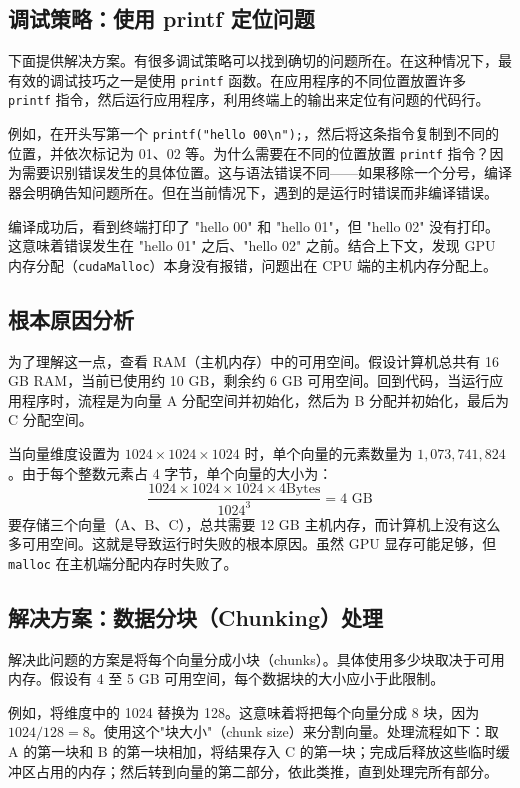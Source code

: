 \subsection{调试策略：使用 printf 定位问题}

下面提供解决方案。有很多调试策略可以找到确切的问题所在。在这种情况下，最有效的调试技巧之一是使用 \texttt{printf} 函数。在应用程序的不同位置放置许多 \texttt{printf} 指令，然后运行应用程序，利用终端上的输出来定位有问题的代码行。

例如，在开头写第一个 \texttt{printf("hello 00\textbackslash n");}，然后将这条指令复制到不同的位置，并依次标记为 01、02 等。为什么需要在不同的位置放置 \texttt{printf} 指令？因为需要识别错误发生的具体位置。这与语法错误不同——如果移除一个分号，编译器会明确告知问题所在。但在当前情况下，遇到的是运行时错误而非编译错误。

编译成功后，看到终端打印了 "hello 00" 和 "hello 01"，但 "hello 02" 没有打印。这意味着错误发生在 "hello 01" 之后、"hello 02" 之前。结合上下文，发现 GPU 内存分配（\texttt{cudaMalloc}）本身没有报错，问题出在 CPU 端的主机内存分配上。

\subsection{根本原因分析}

为了理解这一点，查看 RAM（主机内存）中的可用空间。假设计算机总共有 16 GB RAM，当前已使用约 10 GB，剩余约 6 GB 可用空间。回到代码，当运行应用程序时，流程是为向量 A 分配空间并初始化，然后为 B 分配并初始化，最后为 C 分配空间。

当向量维度设置为 $1024 \times 1024 \times 1024$ 时，单个向量的元素数量为 $1,073,741,824$。由于每个整数元素占 4 字节，单个向量的大小为：
\[\frac{1024 \times 1024 \times 1024 \times 4 \text{Bytes}}{1024^3} = 4 \text{ GB}\]要存储三个向量（A、B、C），总共需要 12 GB 主机内存，而计算机上没有这么多可用空间。这就是导致运行时失败的根本原因。虽然 GPU 显存可能足够，但 \texttt{malloc} 在主机端分配内存时失败了。

\subsection{解决方案：数据分块（Chunking）处理}

解决此问题的方案是将每个向量分成小块（chunks）。具体使用多少块取决于可用内存。假设有 4 至 5 GB 可用空间，每个数据块的大小应小于此限制。

例如，将维度中的 1024 替换为 128。这意味着将把每个向量分成 8 块，因为 $1024 / 128 = 8$。使用这个"块大小"（chunk size）来分割向量。处理流程如下：取 A 的第一块和 B 的第一块相加，将结果存入 C 的第一块；完成后释放这些临时缓冲区占用的内存；然后转到向量的第二部分，依此类推，直到处理完所有部分。

